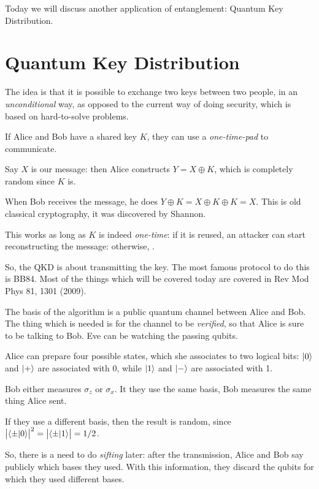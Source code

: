 \documentclass[main.tex]{subfiles}
\begin{document}

Today we will discuss another application of entanglement: Quantum Key Distribution.

\section{Quantum Key Distribution}

The idea is that it is possible to exchange two keys between two people, in an \emph{unconditional} way, as opposed to the current way of doing security, which is based on hard-to-solve problems. 

If Alice and Bob have a shared key \(K\), they can use a \emph{one-time-pad} to communicate. 

Say \(X\) is our message: then Alice constructs \(Y = X \oplus K\), which is completely random since \(K\) is. 

When Bob receives the message, he does \(Y \oplus K = X \oplus K \oplus K = X\). 
This is old classical cryptography, it was discovered by Shannon. 

This works as long as \(K\) is indeed \emph{one-time}: if it is reused, an attacker can start reconstructing the message: otherwise, . 

So, the QKD is about transmitting the key. 
The most famous protocol to do this is BB84. 
Most of the things which will be covered today are covered in 
Rev Mod Phys 81, 1301 (2009).

The basis of the algorithm is a public quantum channel between Alice and Bob. The thing which is needed is for the channel to be \emph{verified}, so that Alice is sure to be talking to Bob. 
Eve can be watching the passing qubits.  

Alice can prepare four possible states, which she associates to two logical bits: \(\ket{0}\) and \(\ket{+}\) are associated with 0, while \(\ket{1}\) and \(\ket{-}\) are associated with 1. 

Bob either measures \(\sigma_{z}\) or \(\sigma_{x}\). 
It they use the same basis, Bob measures the same thing Alice sent. 

If they use a different basis, then the result is random, since \(\abs{\braket{\pm}{0}}^2 =  \abs{\braket{\pm}{1}}= 1 / 2\). 

So, there is a need to do \emph{sifting} later: after the transmission, Alice and Bob say publicly which bases they used. 
With this information, they discard the qubits for which they used different bases. 
\end{document}
